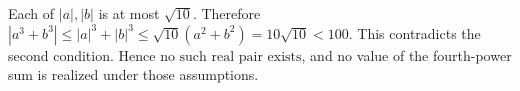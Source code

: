 Each of $|a|,|b|$ is at most $\sqrt{10}$. Therefore $|a^3+b^3|\le|a|^3+|b|^3\le\sqrt{10}(a^2+b^2)=10\sqrt{10}<100$. This contradicts the second condition. Hence $\boxed{\text{no such real pair exists}}$, and no value of the fourth-power sum is realized under those assumptions.
